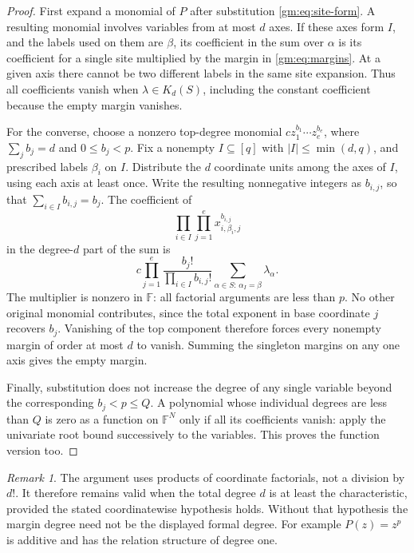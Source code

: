 \documentclass[11pt,a4paper]{article}
\numberwithin{equation}{section}
\theoremstyle{definition}
\theoremstyle{remark}
\newtheorem{remark}[theorem]{Remark}
\newcommand{\F}{\mathbb F}
\newcommand{\1}{\mathbf 1}
\begin{document}
\begin{proof}
First expand a monomial of $P$ after substitution
\eqref{gm:eq:site-form}. A resulting monomial involves variables from at
most $d$ axes. If these axes form $I$, and the labels used on them are
$\beta$, its coefficient in the sum over $\alpha$ is its coefficient for a
single site multiplied by the margin in \eqref{gm:eq:margins}. At a given
axis there cannot be two different labels in the same site expansion.
Thus all coefficients vanish when $\lambda\in K_d(S)$, including the
constant coefficient because the empty margin vanishes.

For the converse, choose a nonzero top-degree monomial
$c z_1^{b_1}\cdots z_e^{b_e}$, where $\sum_j b_j=d$ and $0\leq b_j<p$.
Fix a nonempty $I\subseteq[q]$ with $|I|\leq\min(d,q)$, and prescribed labels
$\beta_i$ on $I$. Distribute the $d$ coordinate units among the axes of
$I$, using each axis at least once. Write the resulting nonnegative
integers as $b_{i,j}$, so that $\sum_{i\in I}b_{i,j}=b_j$.
The coefficient of
\[
 \prod_{i\in I}\prod_{j=1}^e x_{i,\beta_i,j}^{b_{i,j}}
\]
in the degree-$d$ part of the sum is
\begin{equation}\label{gm:eq:coefficient-extraction}
 c\prod_{j=1}^e\frac{b_j!}{\prod_{i\in I}b_{i,j}!}
 \sum_{\alpha\in S:\,\alpha_I=\beta}\lambda_\alpha.
\end{equation}
The multiplier is nonzero in $\F$: all factorial arguments are less than
$p$. No other original monomial contributes, since the total exponent in
base coordinate $j$ recovers $b_j$. Vanishing of the top component
therefore forces every nonempty margin of order at most $d$ to vanish.
Summing the singleton margins on any one axis gives the empty margin.

Finally, substitution does not increase the degree of any single
variable beyond the corresponding $b_j<p\leq Q$. A polynomial whose
individual degrees are less than $Q$ is zero as a function on $\F^N$ only
if all its coefficients vanish: apply the univariate root bound
successively to the variables. This proves the function version too.
\end{proof}

\begin{remark}
The argument uses products of coordinate factorials, not a division by
$d!$. It therefore remains valid when the total degree $d$ is at least the
characteristic, provided the stated coordinatewise hypothesis holds.
Without that hypothesis the margin degree need not be the displayed
formal degree. For example $P(z)=z^p$ is additive and has the relation
structure of degree one.
\end{remark}
\end{document}
